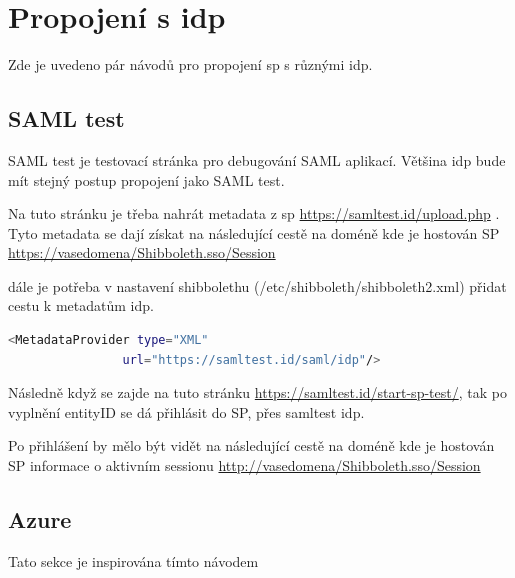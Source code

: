 \section{Propojení s idp}

Zde je uvedeno pár návodů pro propojení sp s různými idp.

\subsection{SAML test}
SAML test je testovací stránka pro debugování SAML aplikací. Většina idp bude mít stejný postup propojení jako SAML test.



Na tuto stránku je třeba nahrát metadata z sp 
\url{https://samltest.id/upload.php}  . Tyto metadata se dají získat na následující cestě na doméně kde je hostován SP \url{https://vasedomena/Shibboleth.sso/Session }

dále je potřeba v nastavení shibbolethu (/etc/shibboleth/shibboleth2.xml) přidat cestu k metadatům idp.
\begin{lstlisting}[language=Bash]
 <MetadataProvider type="XML"
                url="https://samltest.id/saml/idp"/>
\end{lstlisting}

Následně když se zajde na tuto stránku \url{https://samltest.id/start-sp-test/}, tak po vyplnění entityID se dá přihlásit do SP, přes samltest idp.

Po přihlášení by mělo být vidět na následující cestě na doméně kde je hostován SP informace o aktivním sessionu \url{http://vasedomena/Shibboleth.sso/Session} 



\subsection{Azure}

Tato sekce je inspirována tímto návodem\cite{AzureTutorial}


